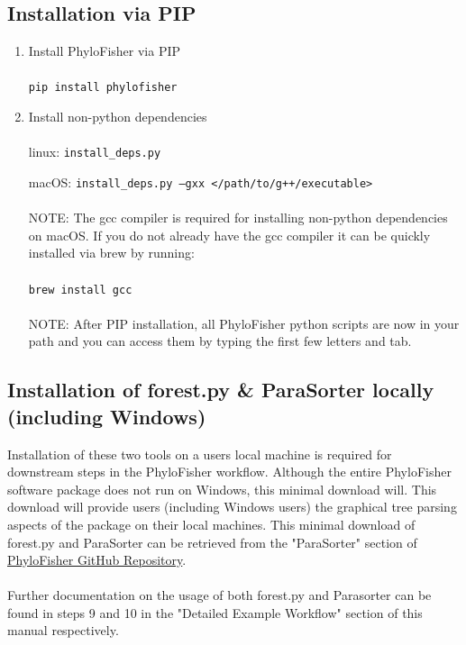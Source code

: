 \documentclass{article}
\def\code#1{\texttt{#1}}
\begin{document}
        \subsection{Installation via PIP}
        \begin{enumerate}
            \item Install PhyloFisher via PIP
            \\\\
           \code{pip install phylofisher}
            \item Install non-python dependencies
            \\\\
            linux: \code{install\_deps.py}
        
            macOS: \code{install\_deps.py --gxx </path/to/g++/executable>}
            \\\\
            NOTE: The gcc compiler is required for installing non-python dependencies on macOS. If you do not already have the gcc compiler it can be quickly installed via brew by running:
            \\\\
            \code{brew install gcc}
            \\\\
            NOTE: After PIP installation, all PhyloFisher python scripts are now in your path and you can access them by typing the first few letters and tab.
        \end{enumerate}
        
        \subsection{Installation of forest.py \& ParaSorter locally (including Windows)}
        Installation of these two tools on a users local machine is required for downstream steps in the PhyloFisher workflow. Although the entire PhyloFisher software package does not run on Windows, this minimal download will. This download will provide users (including Windows users) the graphical tree parsing aspects of the package on their local machines. This minimal download of forest.py and ParaSorter can be retrieved from the "ParaSorter" section of  \href{https://github.com/TheBrownLab/PhyloFisher/tree/master/parasorter}{PhyloFisher GitHub Repository}. 
        \\\\
        Further documentation on the usage of both forest.py and Parasorter can be found in steps 9 and 10 in the "Detailed Example Workflow" section of this manual respectively.
        
\end{document}
